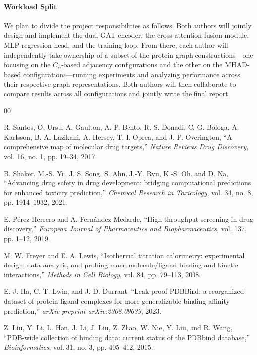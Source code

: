 \documentclass[conference]{IEEEtran}
\begin{document}
\paragraph{Workload Split}
We plan to divide the project responsibilities as follows. Both authors will jointly design and implement the dual GAT encoder, the cross-attention fusion module, MLP regression head, and the training loop. From there, each author will independently take ownership of a subset of the protein graph constructions---one focusing on the $C_\alpha$-based adjacency configurations and the other on the MHAD-based configurations---running experiments and analyzing performance across their respective graph representations. Both authors will then collaborate to compare results across all configurations and jointly write the final report.
\begin{thebibliography}{00}

R. Santos, O. Ursu, A. Gaulton, A. P. Bento, R. S. Donadi, C. G. Bologa, A. Karlsson, B. Al-Lazikani, A. Hersey, T. I. Oprea, and J. P. Overington,
``A comprehensive map of molecular drug targets,''
\textit{Nature Reviews Drug Discovery}, vol. 16, no. 1, pp. 19--34, 2017.

B. Shaker, M.-S. Yu, J. S. Song, S. Ahn, J.-Y. Ryu, K.-S. Oh, and D. Na,
``Advancing drug safety in drug development: bridging computational predictions for enhanced toxicity prediction,''
\textit{Chemical Research in Toxicology}, vol. 34, no. 8, pp. 1914--1932, 2021.

E. P{\'e}rez-Herrero and A. Fern{\'a}ndez-Medarde,
``High throughput screening in drug discovery,''
\textit{European Journal of Pharmaceutics and Biopharmaceutics}, vol. 137, pp. 1--12, 2019.

M. W. Freyer and E. A. Lewis,
``Isothermal titration calorimetry: experimental design, data analysis, and probing macromolecule/ligand binding and kinetic interactions,''
\textit{Methods in Cell Biology}, vol. 84, pp. 79--113, 2008.

E. J. Ha, C. T. Lwin, and J. D. Durrant,
``Leak proof {PDBBind}: a reorganized dataset of protein-ligand complexes for more generalizable binding affinity prediction,''
\textit{arXiv preprint arXiv:2308.09639}, 2023.

Z. Liu, Y. Li, L. Han, J. Li, J. Liu, Z. Zhao, W. Nie, Y. Liu, and R. Wang,
``{PDB}-wide collection of binding data: current status of the {PDBbind} database,''
\textit{Bioinformatics}, vol. 31, no. 3, pp. 405--412, 2015.

\end{thebibliography}
\end{document}
